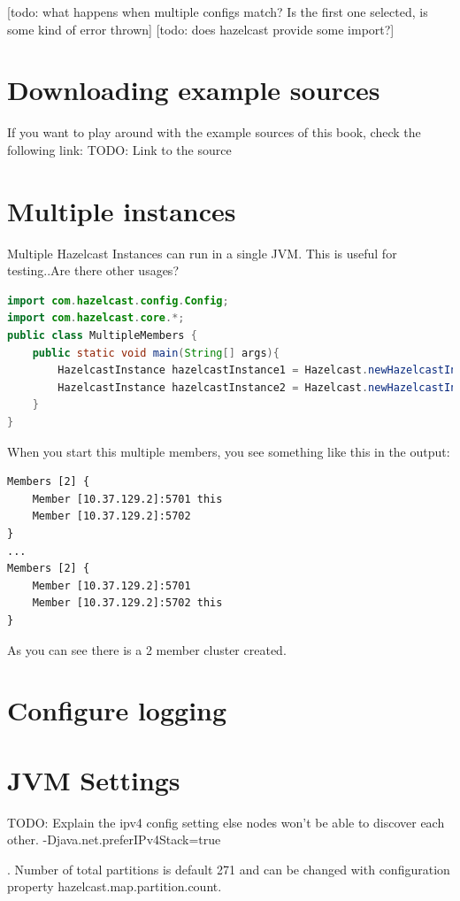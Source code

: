 [todo: what happens when multiple configs match? Is the first one selected, is some kind of error thrown]
[todo: does hazelcast provide some import?]

\section{Downloading example sources}
If you want to play around with the example sources of this book, check the following link:
TODO: Link to the source

\section{Multiple instances}
Multiple Hazelcast Instances can run in a single JVM. This is useful for testing..Are there other usages?

\begin{lstlisting}[language=java]
import com.hazelcast.config.Config;
import com.hazelcast.core.*;
public class MultipleMembers {
    public static void main(String[] args){
        HazelcastInstance hazelcastInstance1 = Hazelcast.newHazelcastInstance(null);
        HazelcastInstance hazelcastInstance2 = Hazelcast.newHazelcastInstance(null);
    }
}
\end{lstlisting}
When you start this multiple members, you see something like this in the output:
\begin{verbatim}
Members [2] {
    Member [10.37.129.2]:5701 this
    Member [10.37.129.2]:5702
}
...
Members [2] {
    Member [10.37.129.2]:5701
    Member [10.37.129.2]:5702 this
}
\end{verbatim}
As you can see there is a 2 member cluster created.

\section{Configure logging}

\section{JVM Settings}
TODO: Explain the ipv4 config setting else nodes won't be able to discover each other.
-Djava.net.preferIPv4Stack=true

. Number of total partitions is default 271 and can be changed with configuration property hazelcast.map.partition.count. 
